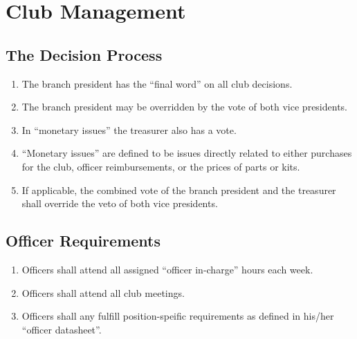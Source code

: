 \documentclass{article}
\begin{document}
\section{Club Management}

\subsection{The Decision Process}
\begin{enumerate}
\item The branch president has the ``final word'' on all club decisions.
\item The branch president may be overridden by the vote of both vice presidents.
\item In ``monetary issues'' the treasurer also has a vote.
\item ``Monetary issues'' are defined to be issues directly related to either purchases for the club, officer reimbursements, or the prices of parts or kits.
\item If applicable, the combined vote of the branch president and the treasurer shall override the veto of both vice presidents.
\end{enumerate}

\subsection{Officer Requirements}
\begin{enumerate}
\item Officers shall attend all assigned ``officer in-charge'' hours each week.
\item Officers shall attend all club meetings.
\item Officers shall any fulfill position-speific requirements as defined in his/her ``officer datasheet''.
\end{enumerate}
\end{document}
